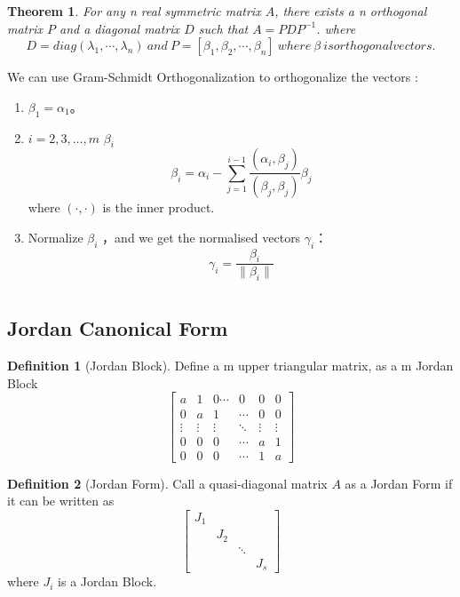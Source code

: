 \documentclass{article}
\newtheorem{theorem}{Theorem}[section]
\theoremstyle{definition}
\newtheorem{defi}{Definition}[section]
\begin{document}
\begin{theorem}
    For any n real symmetric matrix $A$, there exists a n orthogonal matrix $P$ and a diagonal matrix $D$ such that $A=PDP^{-1}$.
    where $$D=diag(\lambda_{1},\cdots,\lambda_{n})\ and\ P=[\beta_{1},\beta_{2},\cdots,\beta_{n}]\ where\ \beta\ is orthogonal vectors.$$
\end{theorem}

We can use Gram-Schmidt Orthogonalization to orthogonalize the vectors :
\begin{enumerate}
    \item $\beta_1 = \alpha_1$。
    \item $i = 2, 3, \ldots, m$  $\beta_i$ 
    \[
    \beta_i = \alpha_i - \sum_{j=1}^{i-1} \frac{(\alpha_i, \beta_j)}{(\beta_j, \beta_j)} \beta_j
    \]
    where $(\cdot, \cdot)$ is the inner product.
    \item Normalize $\beta_i$ ，and we get the normalised vectors $\gamma_i$：
    \[
    \gamma_i = \frac{\beta_i}{\|\beta_i\|}
    \]
\end{enumerate}



\section{}
\subsection{Jordan Canonical Form}
\begin{defi}[Jordan Block]
    Define a m upper triangular matrix, as a m Jordan Block 
$$\begin{bmatrix}
    a&1&0\cdots&0&0&0\\
    0&a&1&\cdots&0&0\\
    \vdots&\vdots&\vdots&\ddots&\vdots&\vdots\\
    0&0&0&\cdots&a&1\\
    0&0&0&\cdots&1&a
\end{bmatrix}$$
    
\end{defi}

\begin{defi}[Jordan Form]
    Call a quasi-diagonal matrix $A$ as a Jordan Form if it can be written as
    \[
\begin{bmatrix}
J_1 & & \\
& J_2 & \\
& & \ddots \\
& & & J_s
\end{bmatrix}
\]
where $J_i$ is a Jordan Block.
\end{defi}
\end{document}
